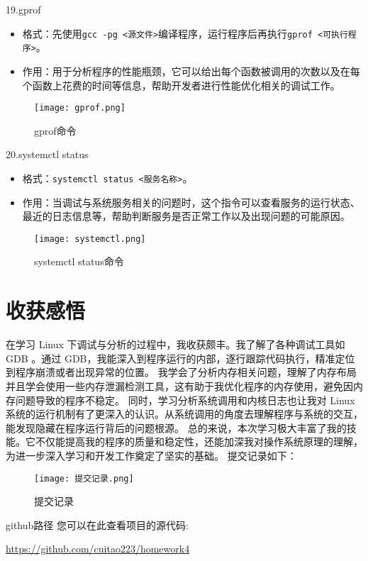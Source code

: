 \documentclass{article}
\begin{document}
19.gprof

\begin{itemize}
    \item 格式：先使用\verb|gcc -pg <源文件>|编译程序，运行程序后再执行\verb|gprof <可执行程序>|。
    \item 作用：用于分析程序的性能瓶颈，它可以给出每个函数被调用的次数以及在每个函数上花费的时间等信息，帮助开发者进行性能优化相关的调试工作。
\end{itemize}
 \begin{figure}[!h]
     \centering
     \texttt{[image: gprof.png]}
     \caption{gprof命令}
     \label{fig:enter-label}
 \end{figure}
20.systemctl status

\begin{itemize}
    \item 格式：\verb|systemctl status <服务名称>|。
    \item 作用：当调试与系统服务相关的问题时，这个指令可以查看服务的运行状态、最近的日志信息等，帮助判断服务是否正常工作以及出现问题的可能原因。
\end{itemize}
 

\begin{figure}[!h]
    \centering
    \texttt{[image: systemctl.png]}
    \caption{systemctl status命令}
    \label{fig:enter-label}
\end{figure}




\section{收获感悟}
在学习 Linux 下调试与分析的过程中，我收获颇丰。我了解了各种调试工具如 GDB 。通过 GDB，我能深入到程序运行的内部，逐行跟踪代码执行，精准定位到程序崩溃或者出现异常的位置。
我学会了分析内存相关问题，理解了内存布局并且学会使用一些内存泄漏检测工具，这有助于我优化程序的内存使用，避免因内存问题导致的程序不稳定。
同时，学习分析系统调用和内核日志也让我对 Linux 系统的运行机制有了更深入的认识。从系统调用的角度去理解程序与系统的交互，能发现隐藏在程序运行背后的问题根源。
总的来说，本次学习极大丰富了我的技能。它不仅能提高我的程序的质量和稳定性，还能加深我对操作系统原理的理解，为进一步深入学习和开发工作奠定了坚实的基础。 
\newline
提交记录如下：

\begin{figure}[!h]
    \centering
    \texttt{[image: 提交记录.png]}
    \caption{提交记录}
    \label{fig:enter-label}
\end{figure}
github路径
您可以在此查看项目的源代码: 

\url{https://github.com/cuitao223/homework4}
\end{document}
